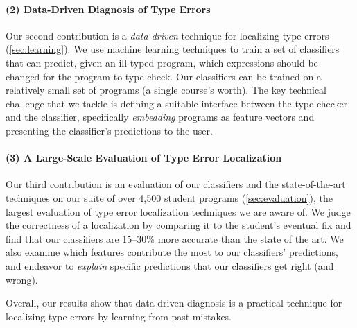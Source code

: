 \paragraph{\textbf{(2) Data-Driven Diagnosis of Type Errors}}
Our second contribution is a \emph{data-driven} technique for localizing
type errors (\autoref{sec:learning}).
%
We use machine learning techniques to train a set of classifiers that can
predict, given an ill-typed program, which expressions should be changed
for the program to type check.
%
Our classifiers can be trained on a relatively small set of programs
(\ie a single course's worth). 
%
%
The key technical challenge that we tackle is defining a suitable
interface between the type checker and the classifier, specifically
\emph{embedding} programs as feature vectors and presenting the
classifier's predictions to the user.

\paragraph{\textbf{(3) A Large-Scale Evaluation of Type Error Localization}}
Our third contribution is an evaluation of our classifiers and the
state-of-the-art techniques on our suite of over 4,500 student programs
(\autoref{sec:evaluation}), the largest evaluation of type error
localization techniques we are aware of.
%
We judge the correctness of a localization by comparing it to the
student's eventual fix and find that our classifiers are 15--30\% more
accurate than the state of the art.
%
We also examine which features contribute the most to our
classifiers' predictions, and endeavor to \emph{explain} specific
predictions that our classifiers get right (and wrong).

Overall, our results show that data-driven diagnosis is a practical
technique for localizing type errors by learning from past mistakes.
%

